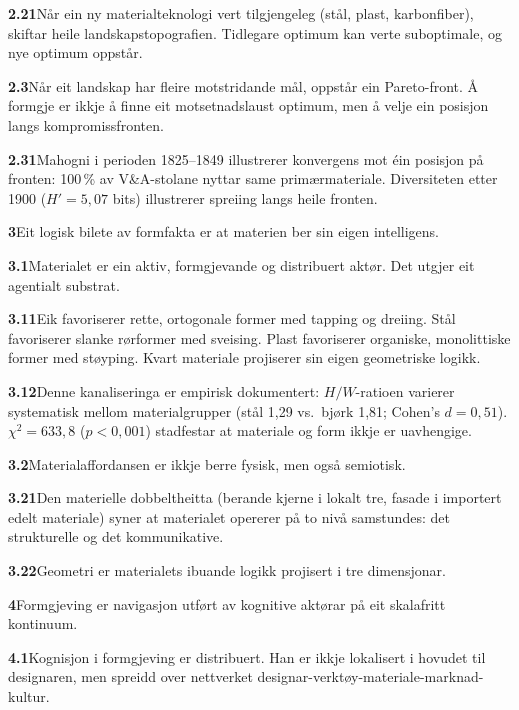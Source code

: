 \documentclass[10pt, a4paper, twocolumn]{article}
\begin{document}
\medskip
\noindent\textbf{2.21}\quad Når ein ny materialteknologi vert tilgjengeleg (stål, plast, karbonfiber), skiftar heile landskapstopografien. Tidlegare optimum kan verte suboptimale, og nye optimum oppstår.

\medskip
\noindent\textbf{2.3}\quad Når eit landskap har fleire motstridande mål, oppstår ein Pareto-front. Å formgje er ikkje å finne eit motsetnadslaust optimum, men å velje ein posisjon langs kompromissfronten.

\medskip
\noindent\textbf{2.31}\quad Mahogni i perioden 1825--1849 illustrerer konvergens mot éin posisjon på fronten: 100\,\% av V\&A-stolane nyttar same primærmateriale. Diversiteten etter 1900 ($H' = 5{,}07$ bits) illustrerer spreiing langs heile fronten.

\bigskip

\noindent\textbf{3}\quad Eit logisk bilete av formfakta er at materien ber sin eigen intelligens.

\medskip
\noindent\textbf{3.1}\quad Materialet er ein aktiv, formgjevande og distribuert aktør. Det utgjer eit agentialt substrat.

\medskip
\noindent\textbf{3.11}\quad Eik favoriserer rette, ortogonale former med tapping og dreiing. Stål favoriserer slanke rørformer med sveising. Plast favoriserer organiske, monolittiske former med støyping. Kvart materiale projiserer sin eigen geometriske logikk.

\medskip
\noindent\textbf{3.12}\quad Denne kanaliseringa er empirisk dokumentert: $H/W$-ratioen varierer systematisk mellom materialgrupper (stål 1,29 vs.\ bjørk 1,81; Cohen's $d = 0{,}51$). $\chi^2 = 633{,}8$ ($p < 0{,}001$) stadfestar at materiale og form ikkje er uavhengige.

\medskip
\noindent\textbf{3.2}\quad Materialaffordansen er ikkje berre fysisk, men også semiotisk.

\medskip
\noindent\textbf{3.21}\quad Den materielle dobbeltheitta (berande kjerne i lokalt tre, fasade i importert edelt materiale) syner at materialet opererer på to nivå samstundes: det strukturelle og det kommunikative.

\medskip
\noindent\textbf{3.22}\quad Geometri er materialets ibuande logikk projisert i tre dimensjonar.

\bigskip

\noindent\textbf{4}\quad Formgjeving er navigasjon utført av kognitive aktørar på eit skalafritt kontinuum.

\medskip
\noindent\textbf{4.1}\quad Kognisjon i formgjeving er distribuert. Han er ikkje lokalisert i hovudet til designaren, men spreidd over nettverket designar-verktøy-materiale-marknad-kultur.
\end{document}
